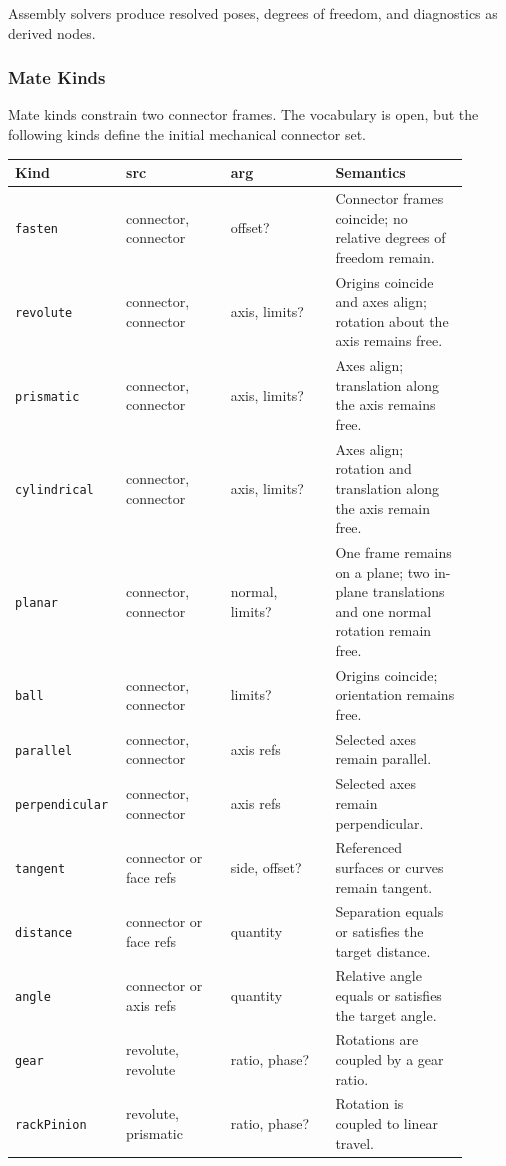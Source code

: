 \documentclass[11pt]{article}
\newcommand{\Type}[1]{\texttt{#1}}
\begin{document}
Assembly solvers produce resolved poses, degrees of freedom, and diagnostics as derived nodes.

\subsubsection{Mate Kinds}

Mate kinds constrain two connector frames. The vocabulary is open, but the following kinds define the initial mechanical connector set.

\begin{center}
\small
\begin{tabular}{@{}p{0.18\linewidth}p{0.22\linewidth}p{0.22\linewidth}p{0.28\linewidth}@{}}
\hline
\textbf{Kind} & \textbf{src} & \textbf{arg} & \textbf{Semantics} \\
\hline
\Type{fasten} & connector, connector & offset? & Connector frames coincide; no relative degrees of freedom remain. \\
\Type{revolute} & connector, connector & axis, limits? & Origins coincide and axes align; rotation about the axis remains free. \\
\Type{prismatic} & connector, connector & axis, limits? & Axes align; translation along the axis remains free. \\
\Type{cylindrical} & connector, connector & axis, limits? & Axes align; rotation and translation along the axis remain free. \\
\Type{planar} & connector, connector & normal, limits? & One frame remains on a plane; two in-plane translations and one normal rotation remain free. \\
\Type{ball} & connector, connector & limits? & Origins coincide; orientation remains free. \\
\Type{parallel} & connector, connector & axis refs & Selected axes remain parallel. \\
\Type{perpendicular} & connector, connector & axis refs & Selected axes remain perpendicular. \\
\Type{tangent} & connector or face refs & side, offset? & Referenced surfaces or curves remain tangent. \\
\Type{distance} & connector or face refs & quantity & Separation equals or satisfies the target distance. \\
\Type{angle} & connector or axis refs & quantity & Relative angle equals or satisfies the target angle. \\
\Type{gear} & revolute, revolute & ratio, phase? & Rotations are coupled by a gear ratio. \\
\Type{rackPinion} & revolute, prismatic & ratio, phase? & Rotation is coupled to linear travel. \\
\hline
\end{tabular}
\end{center}
\end{document}
